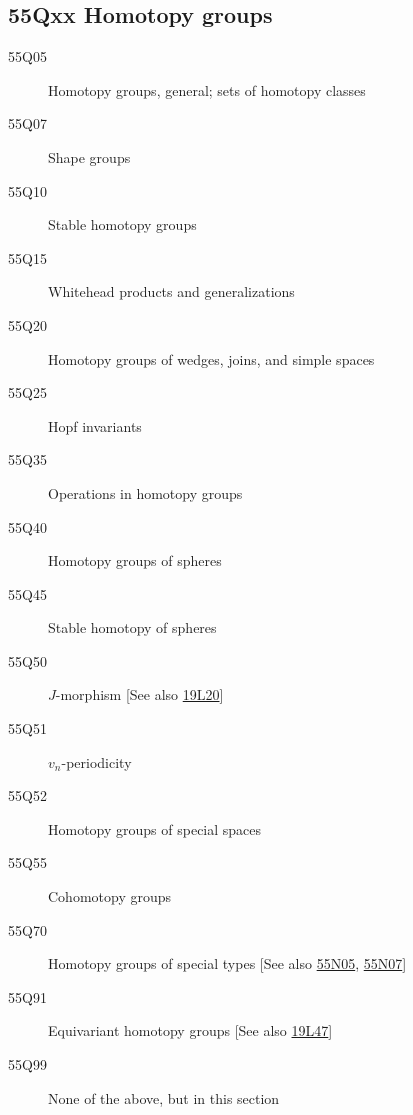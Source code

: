 \documentclass[letterpaper]{article}
\begin{document}
\subsection*{55Qxx  Homotopy groups }\label{55Qxx}
\begin{description}  
\item [55Q05]\label{55Q05} Homotopy groups, general; sets of homotopy classes
\item [55Q07]\label{55Q07} Shape groups
\item [55Q10]\label{55Q10} Stable homotopy groups
\item [55Q15]\label{55Q15} Whitehead products and generalizations
\item [55Q20]\label{55Q20} Homotopy groups of wedges, joins, and simple spaces
\item [55Q25]\label{55Q25} Hopf invariants
\item [55Q35]\label{55Q35} Operations in homotopy groups
\item [55Q40]\label{55Q40} Homotopy groups of spheres
\item [55Q45]\label{55Q45} Stable homotopy of spheres
\item [55Q50]\label{55Q50} $J$-morphism [See also \hyperref[19L20]{19L20}]
\item [55Q51]\label{55Q51} $v_n$-periodicity
\item [55Q52]\label{55Q52} Homotopy groups of special spaces
\item [55Q55]\label{55Q55} Cohomotopy groups
\item [55Q70]\label{55Q70} Homotopy groups of special types [See also \hyperref[55N05]{55N05}, \hyperref[55N07]{55N07}]
\item [55Q91]\label{55Q91} Equivariant homotopy groups [See also \hyperref[19L47]{19L47}]
\item [55Q99]\label{55Q99} None of the above, but in this section
\end{description}
\end{document}
